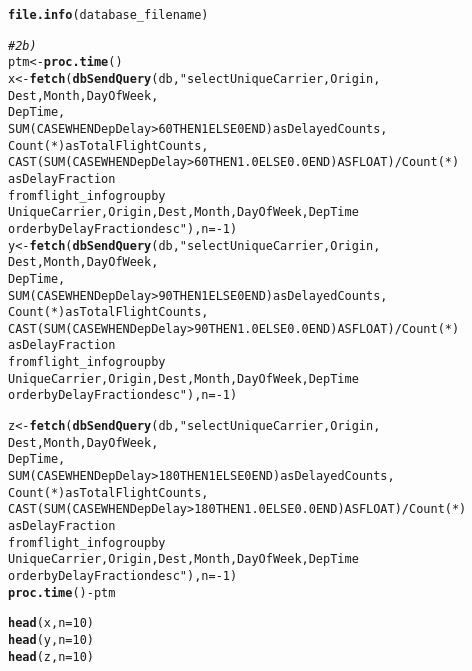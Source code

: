 \documentclass{article}\usepackage[]{graphicx}\usepackage[]{color}
\makeatletter
\newcommand{\hlnum}[1]{\textcolor[rgb]{0.686,0.059,0.569}{#1}}%
\newcommand{\hlstr}[1]{\textcolor[rgb]{0.192,0.494,0.8}{#1}}%
\newcommand{\hlcom}[1]{\textcolor[rgb]{0.678,0.584,0.686}{\textit{#1}}}%
\newcommand{\hlopt}[1]{\textcolor[rgb]{0,0,0}{#1}}%
\newcommand{\hlstd}[1]{\textcolor[rgb]{0.345,0.345,0.345}{#1}}%
\newcommand{\hlkwb}[1]{\textcolor[rgb]{0.69,0.353,0.396}{#1}}%
\newcommand{\hlkwc}[1]{\textcolor[rgb]{0.333,0.667,0.333}{#1}}%
\newcommand{\hlkwd}[1]{\textcolor[rgb]{0.737,0.353,0.396}{\textbf{#1}}}%
\newenvironment{kframe}{%
 \def\at@end@of@kframe{}%
 \ifinner\ifhmode%
  \def\at@end@of@kframe{\end{minipage}}%
  \begin{minipage}{\columnwidth}%
 \fi\fi%
 \def\FrameCommand##1{\hskip\@totalleftmargin \hskip-\fboxsep
 \colorbox{shadecolor}{##1}\hskip-\fboxsep
     \hskip-\linewidth \hskip-\@totalleftmargin \hskip\columnwidth}%
 \MakeFramed {\advance\hsize-\width
   \@totalleftmargin\z@ \linewidth\hsize
   \@setminipage}}%
 {\par\unskip\endMakeFramed%
 \at@end@of@kframe}
\newenvironment{knitrout}{}{} %
\makeatother
\begin{document}
\begin{knitrout}
\begin{kframe}
\begin{alltt}
\hlkwd{file.info}\hlstd{(database_filename)}

\hlcom{# 2b)}
\hlstd{ptm} \hlkwb{<-} \hlkwd{proc.time}\hlstd{()}
\hlstd{x} \hlkwb{<-} \hlkwd{fetch}\hlstd{(}\hlkwd{dbSendQuery}\hlstd{(db,} \hlstr{"select UniqueCarrier, Origin, 
                       Dest, Month, DayOfWeek, 
                       DepTime,
                       SUM(CASE WHEN DepDelay > 60 THEN 1 ELSE 0 END) as DelayedCounts, 
                       Count(*) as TotalFlightCounts,
                       CAST(SUM(CASE WHEN DepDelay > 60 THEN 1.0 ELSE 0.0 END) AS FLOAT) / Count(*) 
                       as DelayFraction
                       from flight_info group by
                       UniqueCarrier, Origin, Dest, Month, DayOfWeek, DepTime
                       order by DelayFraction desc"}\hlstd{),}\hlkwc{n}\hlstd{=}\hlopt{-}\hlnum{1}\hlstd{)}
\hlstd{y} \hlkwb{<-} \hlkwd{fetch}\hlstd{(}\hlkwd{dbSendQuery}\hlstd{(db,} \hlstr{"select UniqueCarrier, Origin, 
                       Dest, Month, DayOfWeek, 
                       DepTime,
                       SUM(CASE WHEN DepDelay > 90 THEN 1 ELSE 0 END) as DelayedCounts, 
                       Count(*) as TotalFlightCounts,
                       CAST(SUM(CASE WHEN DepDelay > 90 THEN 1.0 ELSE 0.0 END) AS FLOAT) / Count(*) 
                       as DelayFraction
                       from flight_info group by
                       UniqueCarrier, Origin, Dest, Month, DayOfWeek, DepTime
                       order by DelayFraction desc"}\hlstd{),}\hlkwc{n}\hlstd{=}\hlopt{-}\hlnum{1}\hlstd{)}

\hlstd{z} \hlkwb{<-} \hlkwd{fetch}\hlstd{(}\hlkwd{dbSendQuery}\hlstd{(db,} \hlstr{"select UniqueCarrier, Origin, 
                       Dest, Month, DayOfWeek, 
                       DepTime,
                       SUM(CASE WHEN DepDelay > 180 THEN 1 ELSE 0 END) as DelayedCounts, 
                       Count(*) as TotalFlightCounts,
                       CAST(SUM(CASE WHEN DepDelay > 180 THEN 1.0 ELSE 0.0 END) AS FLOAT) / Count(*) 
                       as DelayFraction
                       from flight_info group by
                       UniqueCarrier, Origin, Dest, Month, DayOfWeek, DepTime
                       order by DelayFraction desc"}\hlstd{),}\hlkwc{n}\hlstd{=}\hlopt{-}\hlnum{1}\hlstd{)}
\hlkwd{proc.time}\hlstd{()} \hlopt{-} \hlstd{ptm}

\hlkwd{head}\hlstd{(x,}\hlkwc{n}\hlstd{=}\hlnum{10}\hlstd{)}
\hlkwd{head}\hlstd{(y,}\hlkwc{n}\hlstd{=}\hlnum{10}\hlstd{)}
\hlkwd{head}\hlstd{(z,}\hlkwc{n}\hlstd{=}\hlnum{10}\hlstd{)}
\end{alltt}
\end{kframe}
\end{knitrout}
\end{document}
